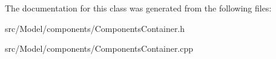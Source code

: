 The documentation for this class was generated from the following files\+:\begin{DoxyCompactItemize}
\item 
src/\+Model/components/Components\+Container.\+h\item 
src/\+Model/components/Components\+Container.\+cpp\end{DoxyCompactItemize}
